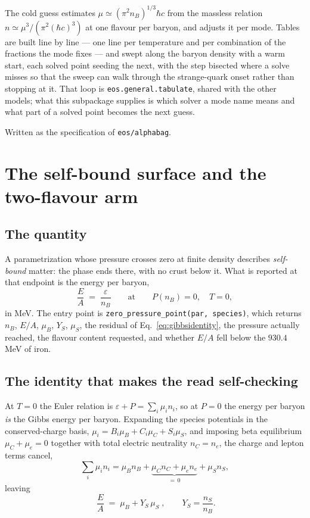 \documentclass[aps,prc,onecolumn,superscriptaddress,nofootinbib,10pt]{revtex4-2}
\newcommand{\nB}{n_B}
\newcommand{\hc}{(\hbar c)^3}
\begin{document}
The cold guess estimates $\mu \simeq (\pi^2 \nB)^{1/3} \hbar c$ from the
massless relation $n \simeq \mu^3/(\pi^2\hc)$ at one flavour per baryon, and
adjusts it per mode. Tables are built line by line --- one line per
temperature and per combination of the fractions the mode fixes --- and swept
along the baryon density with a warm start, each solved point seeding the
next, with the step bisected where a solve misses so that the sweep can walk
through the strange-quark onset rather than stopping at it. That loop is
\texttt{eos.general.tabulate}, shared with the other models; what this
subpackage supplies is which solver a mode name means and what part of a
solved point becomes the next guess.

\begin{acknowledgments}
Written as the specification of \texttt{eos/alphabag}.
\end{acknowledgments}

\section{The self-bound surface and the two-flavour arm}
\label{sec:zeropressure}

\subsection{The quantity}

A parametrization whose pressure crosses zero at finite density describes
\emph{self-bound} matter: the phase ends there, with no crust below it. What is
reported at that endpoint is the energy per baryon,
%
\begin{equation}
  \frac{E}{A} \;=\; \frac{\varepsilon}{n_B}
  \qquad\text{at}\qquad P(n_B) = 0,\quad T = 0 ,
\end{equation}
%
in MeV. The entry point is \texttt{zero\_pressure\_point(par, species)}, which
returns $n_B$, $E/A$, $\mu_B$, $Y_S$, $\mu_S$, the residual of
Eq.~\eqref{eq:gibbsidentity}, the pressure actually reached, the flavour
content requested, and whether $E/A$ fell below the $930.4\;$MeV of iron.

\subsection{The identity that makes the read self-checking}

At $T = 0$ the Euler relation is $\varepsilon + P = \sum_i \mu_i n_i$, so at
$P = 0$ the energy per baryon \emph{is} the Gibbs energy per baryon. Expanding
the species potentials in the conserved-charge basis,
$\mu_i = B_i\mu_B + C_i\mu_C + S_i\mu_S$, and imposing beta equilibrium
$\mu_C + \mu_e = 0$ together with total electric neutrality $n_C = n_e$, the
charge and lepton terms cancel,
%
\begin{equation}
  \sum_i \mu_i n_i
    = \mu_B n_B + \underbrace{\mu_C n_C + \mu_e n_e}_{=\,0} + \mu_S n_S ,
\end{equation}
%
leaving
%
\begin{equation}
  \boxed{\;\frac{E}{A} \;=\; \mu_B + Y_S\,\mu_S\;} ,
  \qquad Y_S = \frac{n_S}{n_B} .
  \label{eq:gibbsidentity}
\end{equation}
\end{document}

